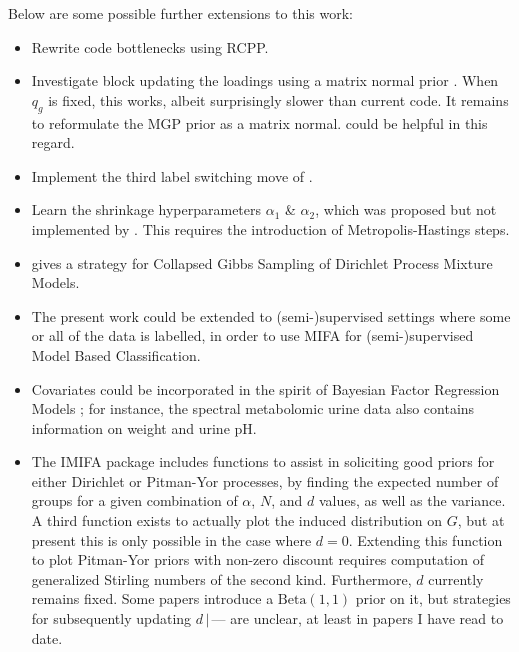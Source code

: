 \documentclass[a4paper,12pt,fleqn]{article}
\newcommand{\pkg}[1]{{\fontseries{b}\selectfont #1}} \newcommand{\diagentry}[1]{\mathmakebox[1.8em]{#1}}
\numberwithin{equation}{section}
\def\given{\,|\,}
\begin{document}
\noindent Below are some possible further extensions to this work:
\begin{itemize}
	\item Rewrite code bottlenecks using \pkg{RCPP}.
	\item Investigate block updating the loadings using a matrix normal prior \citep{Viroli2011}. When $q_g$ is fixed, this works, albeit surprisingly slower than current code. It remains to reformulate the MGP prior as a matrix normal. \citet{Bhattacharya2015} could be helpful in this regard.
	\item Implement the third label switching move of \citet{Hastie2014}.
	\item Learn the shrinkage hyperparameters $\alpha_1$ \& $\alpha_2$, which was proposed but not implemented by \citet{Bhattacharya2011}. This requires the introduction of Metropolis-Hastings steps.
	\item \citet{Yu2009} gives a strategy for Collapsed Gibbs Sampling of Dirichlet Process Mixture Models.
	\item The present work could be extended to (semi-)supervised settings where some or all of the data is labelled, in order to use MIFA for (semi-)supervised Model Based Classification.
	\item Covariates could be incorporated in the spirit of Bayesian Factor Regression Models \citep{West2003, Wang2007, Carvalho2008}; for instance, the spectral metabolomic urine data also contains information on weight and urine pH.
	\item The \pkg{IMIFA} package includes functions to assist in soliciting good priors for either Dirichlet or Pitman-Yor processes, by finding the expected number of groups for a given combination of $\alpha$, $N$, and $d$ values, as well as the variance. A third function exists to actually plot the induced distribution on $G$, but at present this is only possible in the case where $d=0$. Extending this function to plot Pitman-Yor priors with non-zero discount requires computation of generalized Stirling numbers of the second kind. Furthermore, $d$ currently remains fixed. Some papers introduce a $\textrm{Beta}\left(1, 1\right)$ prior on it, but strategies for subsequently updating $d\given\mbox{---}$ are unclear, at least in papers I have read to date.

\end{itemize}
\end{document}
